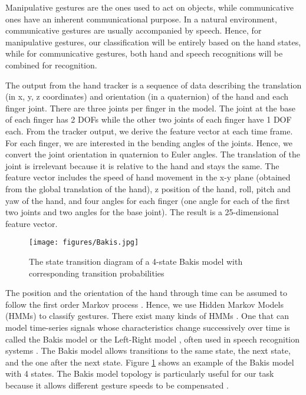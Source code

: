 Manipulative gestures are the ones used to act on objects, while communicative ones have an inherent communicational purpose\cite{Pavlovic97}. In a natural environment, communicative gestures are usually accompanied by speech. Hence, for manipulative gestures, our classification will be entirely based on the hand states, while for communicative gestures, both hand and speech recognitions will be combined for recognition. 

The output from the hand tracker is a sequence of data describing the translation (in x, y, z coordinates) and orientation (in a quaternion) of the hand and each finger joint. There are three joints per finger in the model. The joint at the base of each finger has 2 DOFs while the other two joints of each finger have 1 DOF each. From the tracker output, we derive the feature vector at each time frame. For each finger, we are interested in the bending angles of the joints. Hence, we convert the joint orientation in quaternion to Euler angles. The translation of the joint is irrelevant because it is relative to the hand and stays the same. The feature vector includes the speed of hand movement in the x-y plane (obtained from the global translation of the hand), z position of the hand, roll, pitch and yaw of the hand, and four angles for each finger (one angle for each of the first two joints and two angles for the base joint). The result is a 25-dimensional feature vector.

\begin{figure}[htp]
\begin{center}
\texttt{[image: figures/Bakis.jpg]}
\caption{{The state transition diagram of a 4-state Bakis model with corresponding transition probabilities}}\label{fig:bakis}
\end{center}
\end{figure}

The position and the orientation of the hand through time can be assumed to follow the first order Markov process \cite{Starner95}. Hence, we use Hidden Markov Models (HMMs) to classify gestures. There exist many kinds of HMMs \cite{Rabiner86}. One that can model time-series signals whose characteristics change successively over time is called the Bakis model \cite{Bauer00} or the Left-Right model \cite{Rabiner90}, often used in speech recognition systems \cite{Bauer00}. The Bakis model allows transitions to the same state, the next state, and the one after the next state.  Figure \ref{fig:bakis} shows an example of the Bakis model with 4 states. The Bakis model topology is particularly useful for our task because it allows different gesture speeds to be compensated \cite{Bauer00}.
	
